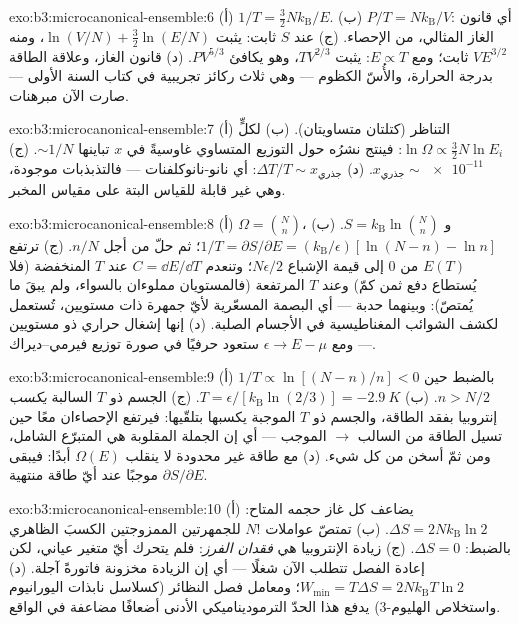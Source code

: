 \begin{solution}{exo:b3:microcanonical-ensemble:6}
(أ) $1/T = \tfrac32 Nk_{\text{B}}/E$. (ب) $P/T =
Nk_{\text{B}}/V$: أي قانون الغاز المثالي، من الإحصاء. (ج) عند
$S$ ثابت: يثبت $\ln(V/N) + \tfrac32\ln(E/N)$، ومنه $VE^{3/2}$ ثابت؛
ومع $E \propto T$: يثبت $TV^{2/3}$، وهو يكافئ
$PV^{5/3}$. (د) قانون الغاز، وعلاقة الطاقة بدرجة الحرارة،
والأُسّ الكظوم --- وهي ثلاث ركائز تجريبية في كتاب السنة
الأولى --- صارت الآن مبرهنات.
\end{solution}

\begin{solution}{exo:b3:microcanonical-ensemble:7}
(أ) التناظر (كتلتان متساويتان). (ب) لكلٍّ $\ln\Omega \propto
\tfrac32 N\ln E_i$: فينتج نشرُه حول التوزيع المتساوي
غاوسيةً في $x$ تباينها $\sim1/N$. (ج) $x_{\text{جذري}} \sim
\num{e-11}$. (د) $\Delta T/T \sim x_{\text{جذري}}$: أي
نانو-نانوكلفنات --- فالتذبذبات موجودة، وهي غير قابلة للقياس
البتة على مقياس المخبر.
\end{solution}

\begin{solution}{exo:b3:microcanonical-ensemble:8}
(أ) $\Omega = \binom Nn$، و $S = k_{\text{B}}\ln\binom Nn$. (ب)
$1/T = \partial S/\partial E = (k_{\text{B}}/\epsilon)[\ln(N-n) -
\ln n]$؛ ثم حلّ من أجل $n/N$. (ج) ترتفع $E(T)$ من $0$ إلى قيمة
الإشباع $N\epsilon/2$؛ وتنعدم $C = \dd E/\dd T$ عند $T$ المنخفضة
(فلا يُستطاع دفع ثمن كمّ) وعند $T$ المرتفعة (فالمستويان مملوءان
بالسواء، ولم يبقَ ما يُمتصّ): وبينهما حدبة --- أي البصمة
المسعّرية لأيّ جمهرة ذات مستويين، تُستعمل لكشف الشوائب
المغناطيسية في الأجسام الصلبة. (د) إنها إشغال حراري ذو مستويين
--- ومع $\epsilon \to E - \mu$ ستعود حرفيًا في صورة
توزيع فيرمي--ديراك.
\end{solution}

\begin{solution}{exo:b3:microcanonical-ensemble:9}
(أ) $1/T \propto \ln[(N-n)/n] < 0$ بالضبط حين $n > N/2$. (ب)
$T = \epsilon/[k_{\text{B}}\ln(2/3)] = -\qty{2.9}{K}$. (ج) الجسم
ذو $T$ السالبة \emph{يكسب} إنتروبيا بفقد الطاقة، والجسم
ذو $T$ الموجبة يكسبها بتلقّيها: فيرتفع الإحصاءان معًا حين تسيل
الطاقة من السالب $\to$ الموجب --- أي إن الجملة المقلوبة هي
المتبرّع الشامل، ومن ثمّ أسخن من كل شيء. (د) مع طاقة غير محدودة
لا ينقلب $\Omega(E)$ أبدًا: فيبقى $\partial S/\partial E$
موجبًا عند أيّ طاقة منتهية.
\end{solution}

\begin{solution}{exo:b3:microcanonical-ensemble:10}
(أ) يضاعف كل غاز حجمه المتاح: $\Delta S =
2Nk_{\text{B}}\ln2$. (ب) تمتصّ عواملات $N!$ للجمهرتين الممزوجتين
الكسبَ الظاهري بالضبط: $\Delta S = 0$. (ج) زيادة الإنتروبيا هي
\emph{فقدان الفرز}: فلم يتحرك أيّ متغير عياني، لكن إعادة
الفصل تتطلب الآن شغلًا --- أي إن الزيادة مخزونة فاتورةً آجلة. (د)
$W_{\min} = T\Delta S =
2Nk_{\text{B}}T\ln2$؛ ومعامل فصل النظائر (كسلاسل نابذات
اليورانيوم واستخلاص الهليوم-3) يدفع هذا الحدّ الترموديناميكي
الأدنى أضعافًا مضاعفة في الواقع.
\end{solution}

